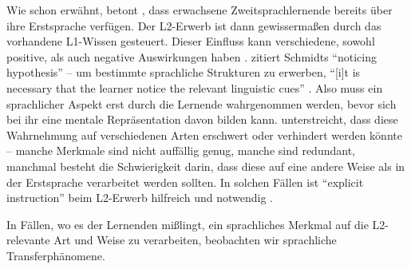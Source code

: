Wie schon erwähnt, betont \cite{Ellis08}, dass erwachsene Zweitsprachlernende bereits über ihre Erstsprache verfügen.
Der L2-Erwerb ist dann gewissermaßen durch das vorhandene L1-Wissen gesteuert.
Dieser Einfluss kann verschiedene, sowohl positive, als auch negative Auswirkungen haben \cite{Ellis08}.
\cite{Ellis04} zitiert Schmidts ``noticing hypothesis'' -- um bestimmte sprachliche Strukturen zu erwerben, ``[i]t is necessary that the learner notice the relevant linguistic cues'' \cite{Schmidt90}.
Also muss ein sprachlicher Aspekt erst durch die Lernende wahrgenommen werden, bevor sich bei ihr eine mentale Repräsentation davon bilden kann.
\cite{Ellis04} unterstreicht, dass diese Wahrnehmung auf verschiedenen Arten erschwert oder verhindert werden könnte --
manche Merkmale sind nicht auffällig genug,
manche sind redundant,
manchmal besteht die Schwierigkeit darin, dass diese auf eine andere Weise als in der Erstsprache verarbeitet werden sollten.
In solchen Fällen ist ``explicit instruction'' beim L2-Erwerb hilfreich und notwendig \cite{Ellis04}.

In Fällen, wo es der Lernenden mißlingt, ein sprachliches Merkmal auf die L2-relevante Art und Weise zu verarbeiten, beobachten wir sprachliche Transferphänomene.








